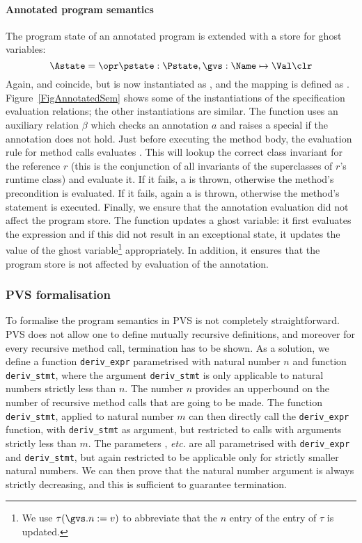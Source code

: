 \paragraph{Annotated program semantics}


The program state of an annotated program is extended with a store for
ghost variables:
\[
\Astate = \opr \pstate : \Pstate, \gvs : \Name \mapsto \Val \clr
\]
Again, \FullProgram and \Program coincide, but \FullState is now
instantiated as \Astate, and the mapping \progstate is defined as
\pstate. Figure~\ref{FigAnnotatedSem} shows some of the 
instantiations of the specification evaluation relations; the other
instantiations are similar. The function \gammain uses an auxiliary
relation \(\beta\) which checks an annotation \(a\) and raises
a special \JMLExc if the annotation does not hold. Just before
executing the method body, the evaluation rule for method calls
evaluates \gammain. This will lookup the correct class invariant for
the reference \(r\) (this is the conjunction of all invariants of the
superclasses of \(r\)'s runtime class) and evaluate it. If it fails, a
\JMLExc is thrown, otherwise the method's precondition is
evaluated. If it fails, again a \JMLExc is thrown, otherwise the
method's \preset statement is executed. Finally, we ensure that the
annotation evaluation did not affect the program store. The function
\deltaset updates a ghost variable: it first evaluates the expression
and if this did not result in an exceptional state, it updates the
value of the ghost variable\footnote{We use \(\tau(\gvs.n := v)\) to
abbreviate that the \(n\) entry of the \gvs entry of \(\tau\) is
updated.} appropriately. In addition, it ensures that the program
store is not affected by evaluation of the annotation.


\subsubsection{PVS formalisation}
To formalise the program semantics in PVS is not completely
straightforward. PVS does not allow one to define mutually recursive
definitions, and moreover for every recursive method call, termination
has to be shown. As a solution, we define a function
\texttt{deriv\_expr} parametrised with 
natural number \(n\) and function \texttt{deriv\_stmt}, where the
argument \texttt{deriv\_stmt} is only applicable to natural numbers
strictly less than \(n\). The number \(n\) provides an upperbound on
the number of recursive method calls that are going to be made.  The
function \texttt{deriv\_stmt}, applied to natural number \(m\) can
then directly call the \texttt{deriv\_expr} function, with
\texttt{deriv\_stmt} as argument, but restricted to calls with arguments
strictly less than \(m\). The parameters \gammain, \gammanorm
\emph{etc.} are all parametrised with \texttt{deriv\_expr} and
\texttt{deriv\_stmt}, but again restricted to be applicable only for
strictly smaller natural numbers. We can then prove that the natural
number argument is always strictly decreasing, and this is sufficient
to guarantee termination.







